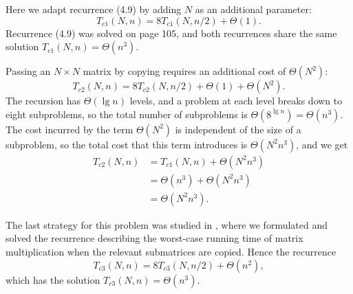 Here we adapt recurrence (4.9) by adding $N$ as an additional parameter:
\[
    T_{c1}(N,n) = 8T_{c1}(N,n/2)+\Theta(1).
\]
Recurrence (4.9) was solved on page 105, and both recurrences share the same solution $T_{c1}(N,n)=\Theta(n^3)$.

Passing an $N\times N$ matrix by copying requires an additional cost of $\Theta(N^2)$:
\[
    T_{c2}(N,n) = 8T_{c2}(N,n/2)+\Theta(1)+\Theta(N^2).
\]
The recursion has $\Theta(\lg n)$ levels, and a problem at each level breaks down to eight subproblems, so the total number of subproblems is $\Theta(8^{\lg n})=\Theta(n^3)$.
The cost incurred by the term $\Theta(N^2)$ is independent of the size of a subproblem, so the total cost that this term introduces is $\Theta(N^2n^3)$, and we get
\begin{align*}
    T_{c2}(N,n) &= T_{c1}(N,n)+\Theta(N^2n^3) \\
    &= \Theta(n^3)+\Theta(N^2n^3) \\
    &= \Theta(N^2n^3).
\end{align*}

The last strategy for this problem was studied in , where we formulated and solved the recurrence describing the worst-case running time of matrix multiplication when the relevant submatrices are copied.
Hence the recurrence
\[
    T_{c3}(N,n) = 8T_{c3}(N,n/2)+\Theta(n^2),
\]
which has the solution $T_{c3}(N,n)=\Theta(n^3)$.
